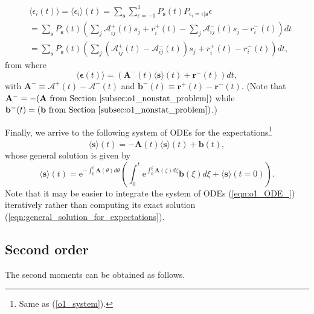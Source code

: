 \documentclass[a4paper, 11pt]{article}
\begin{document}
\begin{align*}
  &\langle\epsilon_i(t)\rangle = \langle\epsilon_i\rangle(t) = \sum_{\mathbf s}\sum_{\epsilon=-1}^1P_{\mathbf s}(t)P_{\epsilon_i=\epsilon|\mathbf s}\epsilon\\
  &= \sum_{\mathbf s}P_{\mathbf s}(t)\left(\sum_{j}\mathcal A^+_{ij}(t)s_j+r^+_i(t) - \sum_{j}\mathcal A^-_{ij}(t)s_j-r^-_i(t)\right)dt\\
  &= \sum_{\mathbf s}P_{\mathbf s}(t)\left(\sum_{j}\left(\mathcal A^+_{ij}(t)-\mathcal A^-_{ij}(t)\right)s_j + r^+_i(t) - r^-_i(t)\right)dt,
\end{align*}
from where
\begin{equation}
  \langle\boldsymbol \epsilon(t)\rangle = \left(\mathbf A^-(t)\langle \mathbf s\rangle(t) + \mathbf r^-(t)\right)dt,
\end{equation}
with $\mathbf A^- \equiv \boldsymbol{\mathcal A}^+(t)- \boldsymbol{\mathcal A}^-(t)$ and $\mathbf b^-(t) \equiv \mathbf r^+(t) - \mathbf r^-(t)$. (Note that $\mathbf A^- = -(\mathbf A\text{ from Section \ref{subsec:o1_nonstat_problem})}$ while $\mathbf b^-(t) = (\mathbf b\text{ from Section \ref{subsec:o1_nonstat_problem})}$.)

Finally, we arrive to the following system of ODEs for the expectations\footnote{Same as (\ref{o1_system}).}
\begin{equation}\label{eqn:o1_ODE_}
  \dot{\langle\mathbf s\rangle}(t) = -\mathbf A(t)\langle \mathbf s\rangle(t) + \mathbf b(t),
\end{equation}
whose general solution is given by
\begin{equation}\label{eqn:general_solution_for_expectations}
  \langle\mathbf s\rangle(t) = \mathrm e^{-\int_0^t\mathbf A(\theta)d\theta}\left(\int_0^t\mathrm e^{\int_0^\xi\mathbf A(\zeta)d\zeta}\mathbf b(\xi)d\xi + \langle\mathbf s\rangle(t=0)\right).
\end{equation}
Note that it may be easier to integrate the system of ODEs (\ref{eqn:o1_ODE_}) iteratively rather than computing its exact solution (\ref{eqn:general_solution_for_expectations}).

\subsection{Second order}
The second moments can be obtained as follows.
\end{document}
